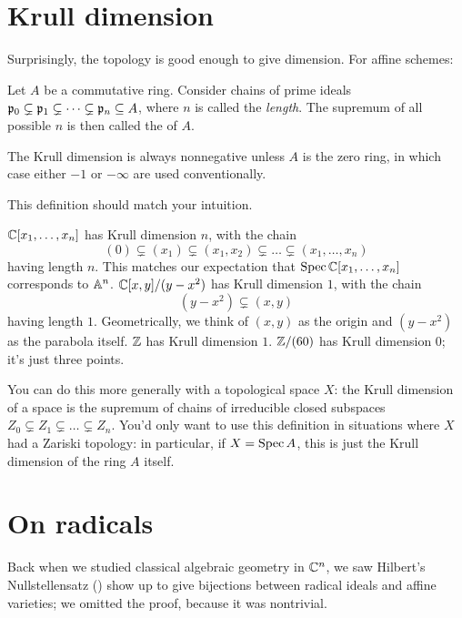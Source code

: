 \section{Krull dimension}
Surprisingly, the topology is good enough to give dimension.
For affine schemes:
\begin{definition}
	Let $A$ be a commutative ring.
	Consider chains of prime ideals
	$\mathfrak p_0 \subsetneq \mathfrak p_1 \subsetneq \dots \subsetneq \mathfrak p_n \subseteq A$,
	where $n$ is called the \emph{length}.
	The supremum of all possible $n$ is then called the  of $A$.

	The Krull dimension is always nonnegative unless $A$ is the zero ring,
	in which case either $-1$ or $-\infty$ are used conventionally.
\end{definition}

This definition should match your intuition.
\begin{example}
	\listhack
	\begin{enumerate}[(a)]
		\ii $\mathbb C[x_1, \dots, x_n]$ has Krull dimension $n$, with the chain
		\[ (0) \subsetneq (x_1) \subsetneq (x_1, x_2) \subsetneq \dots \subsetneq (x_1, \dots, x_n) \]
		having length $n$.
		This matches our expectation that $\operatorname{Spec} \mathbb C[x_1, \dots, x_n]$ corresponds to $\mathbb A^n$.
		\ii $\mathbb C[x,y] / (y-x^2)$ has Krull dimension $1$, with the chain
		\[ (y-x^2) \subsetneq (x,y) \]
		having length $1$.
		Geometrically, we think of $(x,y)$ as the origin and $(y-x^2)$ as the parabola itself.
		\ii $\mathbb Z$ has Krull dimension $1$.
		\ii $\mathbb Z/(60)$ has Krull dimension $0$; it's just three points.
	\end{enumerate}
\end{example}

You can do this more generally with a topological space $X$:
the Krull dimension of a space is the supremum of chains of irreducible closed subspaces
$Z_0 \subsetneq Z_1 \subsetneq \dots \subsetneq Z_n$.
You'd only want to use this definition in situations
where $X$ had a Zariski topology:
in particular, if $X = \operatorname{Spec} A$, this is just the Krull dimension of the ring $A$ itself.

\section{On radicals}
Back when we studied classical algebraic geometry in $\mathbb C^n$,
we saw Hilbert's Nullstellensatz () show up
to give bijections between radical ideals and affine varieties;
we omitted the proof, because it was nontrivial.

